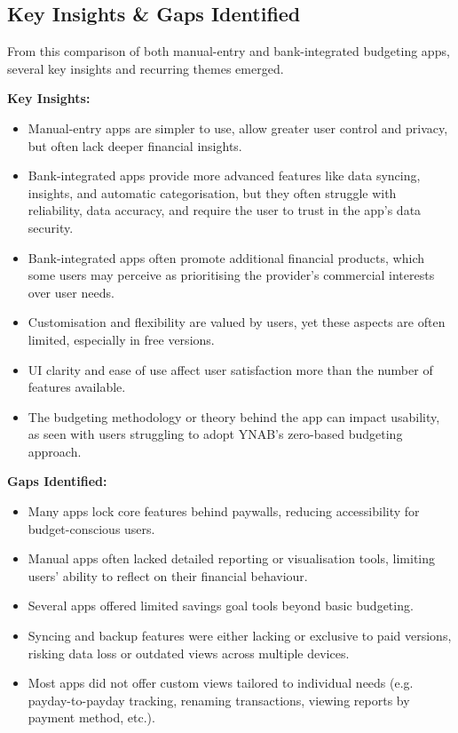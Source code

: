 \documentclass{l4proj}
\begin{document}
\subsection{Key Insights \& Gaps Identified}

From this comparison of both manual-entry and bank-integrated budgeting apps, several key insights and recurring themes emerged.

\vspace{0.5em}
\textbf{Key Insights:}
\begin{itemize}
  \item Manual-entry apps are simpler to use, allow greater user control and privacy, but often lack deeper financial insights.
  \item Bank-integrated apps provide more advanced features like data syncing, insights, and automatic categorisation, but they often struggle with reliability, data accuracy, and require the user to trust in the app’s data security.
  \item Bank-integrated apps often promote additional financial products, which some users may perceive as prioritising the provider’s commercial interests over user needs.
  \item Customisation and flexibility are valued by users, yet these aspects are often limited, especially in free versions.
  \item UI clarity and ease of use affect user satisfaction more than the number of features available.
  \item The budgeting methodology or theory behind the app can impact usability, as seen with users struggling to adopt YNAB’s zero-based budgeting approach.
\end{itemize}

\vspace{0.5em}
\textbf{Gaps Identified:}
\begin{itemize}
  \item Many apps lock core features behind paywalls, reducing accessibility for budget-conscious users.
  \item Manual apps often lacked detailed reporting or visualisation tools, limiting users’ ability to reflect on their financial behaviour.
  \item Several apps offered limited savings goal tools beyond basic budgeting.
  \item Syncing and backup features were either lacking or exclusive to paid versions, risking data loss or outdated views across multiple devices.
  \item Most apps did not offer custom views tailored to individual needs (e.g. payday-to-payday tracking, renaming transactions, viewing reports by payment method, etc.).
\end{itemize}
\end{document}
